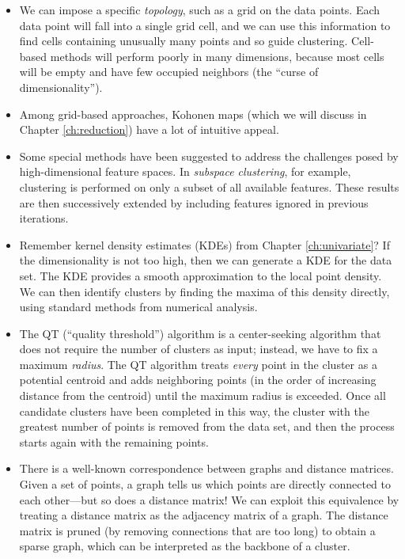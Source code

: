 \begin{itemize}
\item We can impose a specific \emph{topology}, such as a grid on the
  data points. Each data point will fall into a single grid cell, and
  we can use this information to find cells containing unusually many
  points and so guide clustering.  Cell-based methods will perform
  poorly in many dimensions, because most cells will be empty and have
  few occupied neighbors (the ``curse of dimensionality'').
  
\item Among grid-based approaches, Kohonen maps (which we will discuss
  in Chapter \ref{ch:reduction}) have a lot of intuitive appeal.

\item Some special methods have been suggested to address the
  challenges posed by high-dimensional feature spaces. In
  \emph{subspace clustering},  for example, clustering is performed on
  only a subset of all available features. These results are then
  successively extended by including features ignored in previous
  iterations.

\item Remember kernel density estimates (KDEs) from Chapter
  \ref{ch:univariate}?  If the dimensionality is not too high, then we
  can generate a KDE for the data set. The KDE provides a smooth
  approximation to the local point density. We can then identify
  clusters by finding the maxima of this density directly, using
  standard methods from numerical analysis.

\item The QT (``quality threshold'') algorithm  is a center-seeking
  algorithm that does not require the number of clusters as input;
  instead, we have to fix a maximum \emph{radius}. The QT algorithm
  treats \emph{every} point in the cluster as a potential centroid and
  adds neighboring points (in the order of increasing distance from
  the centroid) until the maximum radius is exceeded.  Once\vadjust{\pagebreak} all
  candidate clusters have been completed in this way, the cluster with
  the greatest number of points is removed from the data set, and then
  the process starts again with the remaining points.
      
\item There is a well-known correspondence between graphs and distance
  matrices. Given a set of points, a graph tells us which points are
  directly connected to each other---but so does a distance matrix!  
  We can exploit this equivalence by treating a distance matrix as the
  adjacency matrix of a graph. The distance matrix is pruned (by
  removing connections that are too long) to obtain a sparse graph,
  which can be interpreted as the backbone of a cluster.


\end{itemize}
